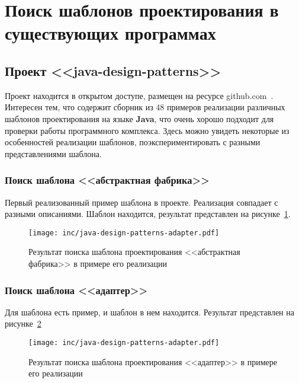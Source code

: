 \section{Поиск шаблонов проектирования в существующих программах}

\subsection*{Проект <<java-design-patterns>>}

Проект находится в открытом доступе, размещен на ресурсе
github.com~\cite{java-design-patterns}.
Интересен тем, что содержит сборник из 48 примеров реализации различных
шаблонов проектирования на языке \textbf{Java},
что очень хорошо подходит для проверки работы программного комплекса.
Здесь можно увидеть некоторые из особенностей реализации шаблонов,
поэкспериментировать с разными представлениями шаблона.

\subsubsection*{Поиск шаблона <<абстрактная фабрика>>}

Первый реализованный пример шаблона в проекте.
Реализация совпадает с разными описаниями.
Шаблон находится, результат представлен на рисунке~\ref{fig:java-design-patterns-abstract-factory}.

\begin{figure}[!ht]
\centering
\texttt{[image: inc/java-design-patterns-adapter.pdf]}
\caption{Результат поиска шаблона проектирования <<абстрактная фабрика>> в примере его реализации}
\label{fig:java-design-patterns-abstract-factory}
\end{figure}

\subsubsection*{Поиск шаблона <<адаптер>>}

Для шаблона есть пример, и шаблон в нем находится.
Результат представлен на рисунке~\ref{fig:java-design-patterns-adapter}

\begin{figure}[!ht]
\centering
\texttt{[image: inc/java-design-patterns-adapter.pdf]}
\caption{Результат поиска шаблона проектирования <<адаптер>> в примере его реализации}
\label{fig:java-design-patterns-adapter}
\end{figure}

